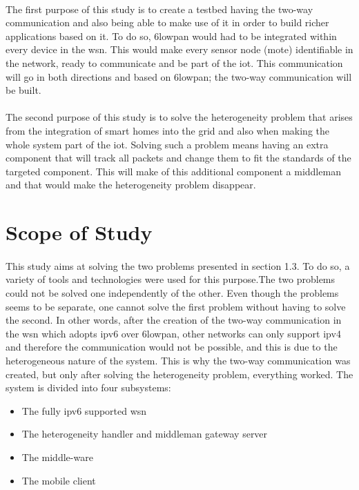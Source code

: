 \documentclass[oneside,12pt,a4paper,final]{book}
\begin{document}
\paragraph{}
The first purpose of this study is to create a testbed having the two-way communication and also being able to make use of it in order to build richer applications based on it. To do so, \gls{6lowpan} would had to be integrated within every device in the \gls{wsn}. This would make every sensor node (mote) identifiable in the network, ready to communicate and be part of the \gls{iot}. This communication will go in both directions and based on \gls{6lowpan}; the two-way communication will be built.
\paragraph{}
The second purpose of this study is to solve the heterogeneity problem that arises from the integration of smart homes into the grid and also when making the whole system part of the \gls{iot}. Solving such a problem means having an extra component that will track all  packets and change them to fit the standards of the targeted component. This will make of this additional component a middleman and that would make the heterogeneity problem disappear.

\section{Scope of Study}
\paragraph{}
This study aims at solving the two problems presented in section 1.3. To do so, a variety of tools and technologies were used for this purpose.The two problems could not be solved one independently of the other. Even though the problems seems to be separate, one cannot solve  the first problem without having to solve the second. In other words, after the creation of the two-way communication in the \gls{wsn} which adopts \gls{ipv6} over \gls{6lowpan}, other networks can only support \gls{ipv4} and therefore the communication would not be possible, and this is due to the heterogeneous nature of the system. This is why the two-way communication was created, but only after solving the heterogeneity problem, everything worked.
The system is divided into four subsystems:
\begin{itemize}
\item The fully \gls{ipv6} supported \gls{wsn}
\item The heterogeneity handler and middleman gateway server
\item The middle-ware
\item The mobile client
\end{itemize}
\end{document}
